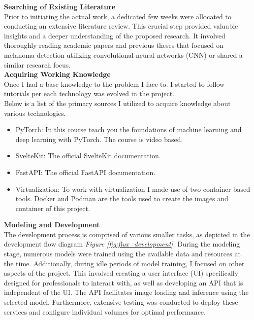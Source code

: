 \vspace{0.5cm}
\textbf{Searching of Existing Literature} \\

Prior to initiating the actual work, a dedicated few weeks were allocated to conducting an extensive literature review. This crucial step provided valuable insights and a deeper understanding of the proposed research. It involved thoroughly reading academic papers and previous theses that focused on melanoma detection utilizing convolutional neural networks (CNN) or shared a similar research focus. \\

\vspace{0.5cm}
\textbf{Acquiring Working Knowledge} \\

Once I had a base knowledge to the problem I face to. I started to follow tutorials per each technology was evolved in the project. \\

Below is a list of the primary sources I utilized to acquire knowledge about various technologies. \\

\begin{itemize}
    \item PyTorch: \cite{LearnPyTorch} In this course teach you the foundations of machine learning and deep learning with PyTorch. The course is video based.

    \item SvelteKit: \cite{LearnSvelteKit} The official SvelteKit documentation.

    \item FastAPI: \cite{LearnFastAPI} The official FastAPI documentation.

    \item Virtualization: To work with virtualization I made use of two container based tools. Docker \cite{LearnDocker} and Podman \cite{LearnPodman} are the tools used to create the images and container of this project.
\end{itemize}

\vspace{0.5cm}
\textbf{Modeling and Development} \\

The development process is comprised of various smaller tasks, as depicted in the development flow diagram \textit{Figure \ref{fig:flux_development}}. During the modeling stage, numerous models were trained using the available data and resources at the time. Additionally, during idle periods of model training, I focused on other aspects of the project. This involved creating a user interface (UI) specifically designed for professionals to interact with, as well as developing an API that is independent of the UI. The API facilitates image loading and inference using the selected model. Furthermore, extensive testing was conducted to deploy these services and configure individual volumes for optimal performance. \\

